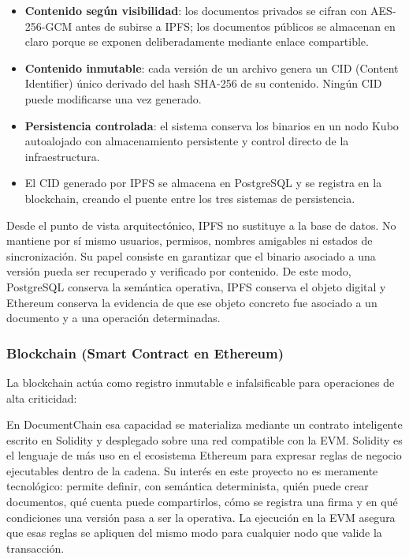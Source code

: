 \documentclass[11pt, a4paper]{article}
\begin{document}
\begin{itemize}
    \item \textbf{Contenido según visibilidad}: los documentos privados se cifran con AES-256-GCM antes de subirse a IPFS; los documentos públicos se almacenan en claro porque se exponen deliberadamente mediante enlace compartible.
    \item \textbf{Contenido inmutable}: cada versión de un archivo genera un CID (Content Identifier) único derivado del hash SHA-256 de su contenido. Ningún CID puede modificarse una vez generado.
    \item \textbf{Persistencia controlada}: el sistema conserva los binarios en un nodo Kubo autoalojado con almacenamiento persistente y control directo de la infraestructura.
    \item El CID generado por IPFS se almacena en PostgreSQL y se registra en la blockchain, creando el puente entre los tres sistemas de persistencia.
\end{itemize}

Desde el punto de vista arquitectónico, IPFS no sustituye a la base de datos. No mantiene por sí mismo usuarios, permisos, nombres amigables ni estados de sincronización. Su papel consiste en garantizar que el binario asociado a una versión pueda ser recuperado y verificado por contenido. De este modo, PostgreSQL conserva la semántica operativa, IPFS conserva el objeto digital y Ethereum conserva la evidencia de que ese objeto concreto fue asociado a un documento y a una operación determinadas.

\subsubsection{Blockchain (Smart Contract en Ethereum)}

La blockchain actúa como registro inmutable e infalsificable para operaciones de alta criticidad:

En DocumentChain esa capacidad se materializa mediante un contrato inteligente escrito en Solidity y desplegado sobre una red compatible con la EVM. Solidity es el lenguaje de más uso en el ecosistema Ethereum para expresar reglas de negocio ejecutables dentro de la cadena. Su interés en este proyecto no es meramente tecnológico: permite definir, con semántica determinista, quién puede crear documentos, qué cuenta puede compartirlos, cómo se registra una firma y en qué condiciones una versión pasa a ser la operativa. La ejecución en la EVM asegura que esas reglas se apliquen del mismo modo para cualquier nodo que valide la transacción.
\end{document}
